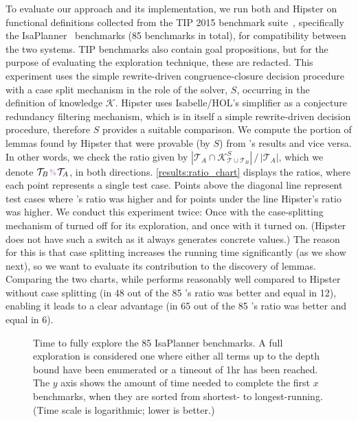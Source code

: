 To evaluate our approach and its implementation, we run both \TheSy and Hipster
on functional definitions collected from the TIP 2015 benchmark suite~\cite{CICM2015:Claessen}, specifically the IsaPlanner~\cite{ITP2010:Johansson} benchmarks (85 benchmarks in total), for compatibility between the two systems.
TIP benchmarks also contain goal propositions, but for the purpose of evaluating the exploration technique, these are redacted.
This experiment uses the simple rewrite-driven congruence-closure decision procedure with a case split mechanism in the role of the solver, $S$, occurring in the definition of knowledge $\mathcal{K}$.
Hipster uses Isabelle/HOL's simplifier as a conjecture redundancy filtering mechanism, which is in itself a simple rewrite-driven decision procedure, therefore $S$ provides a suitable comparison.
We compute the portion of lemmas found by Hipster that were provable (by $S$) from \TheSy's results and vice versa.
In other words, we check the ratio given by $| \mathcal{T}_A \cap \mathcal{K}_{\mathcal{T}\cup\mathcal{T}_B}^S | \,/\, | \mathcal{T}_A |$, which we denote $\mathcal{T}_B\cmptheories\mathcal{T}_A$, in both directions.
\autoref{results:ratio_chart} displays the ratios, where each point represents a single test case.
Points above the diagonal line represent test cases where \TheSy's ratio was higher and for points under the line Hipster's ratio was higher.
We conduct this experiment twice: Once with the case-splitting mechanism of \TheSy turned off for its exploration, and once with it turned on. (Hipster does not have such a switch as it always generates concrete values.)
The reason for this is that case splitting increases the running time significantly (as we show next), so we want to evaluate its contribution to the discovery of lemmas.
Comparing the two charts, while \TheSy performs reasonably well compared to Hipster without case splitting (in 48 out of the 85 \TheSy's ratio was better and equal in 12), enabling it leads to a clear advantage (in 65 out of the 85 \TheSy's ratio was better and equal in 6).


\begin{figure}[t]
\centering
%


\caption[Time to fully explore the 85 IsaPlanner benchmarks]{Time to fully explore the 85 IsaPlanner benchmarks.
A full exploration is considered one where either all terms up to the depth bound have been enumerated or a timeout of 1hr has been reached.
The $y$ axis shows the amount of time needed to complete the first $x$ benchmarks, when they are sorted from shortest- to longest-running.
(Time scale is logarithmic; lower is better.)}
\label{results:time-perc-table}
\end{figure}

